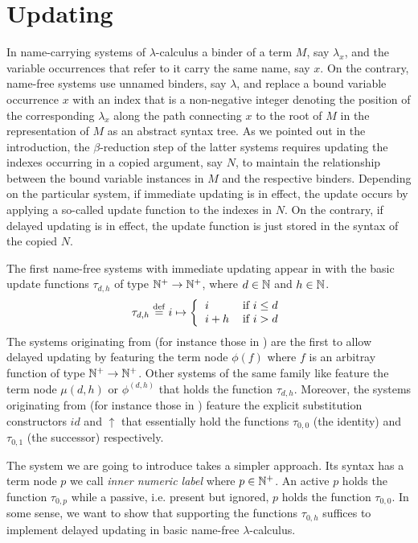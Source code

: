 \section{Updating}
\label{sec:updating}

In name-carrying systems of $\lambda$-calculus
a binder of a term $M$, say $\lambda_x$, and the variable occurrences
that refer to it carry the same name, say $x$.
On the contrary, name-free systems use unnamed binders, say $\lambda$,
and replace a bound variable occurrence $x$
with an index that is a non-negative integer denoting the position of
the corresponding $\lambda_x$ along the path connecting $x$ to the
root of $M$ in the representation of $M$ as an abstract syntax tree.
As we pointed out in the introduction,
the $\beta$-reduction step of the latter systems  
requires updating the indexes occurring in a copied
argument, say $N$, to maintain the relationship between the bound variable
instances in $M$ and the respective binders.
Depending on the particular system,
if immediate updating is in effect, the update occurs by 
applying a so-called update function to the indexes in $N$. On the
contrary, if delayed updating is in effect, the update function
is just stored in the syntax of the copied $N$.

The first name-free systems with immediate updating appear in \cite{Bru72}
with the basic update functions $\tau_{d,h}$ of type $\mathbb{N}^+ \to \mathbb{N}^+$,
where $d\in\mathbb{N}$ and $h\in\mathbb{N}$.
\[
\tau_{d,h} \defeq i \mapsto
\left\{\begin{tabular}{ll}
$i$&if $i \le d$\\
$i+h$&if $i > d$\\
\end{tabular}\right.
\]
The systems originating from \cite{Bru78a}
(for instance those in \cite{Bru78b})
are the first to allow delayed updating
by featuring the term node $\phi(f)$
where $f$ is an arbitray function of type $\mathbb{N}^+ \to \mathbb{N}^+$.
Other systems of the same family like \cite{Ned79,Ned80,KN93}
feature the term node $\mu(d,h)$ or $\phi^{(d,h)}$
that holds the function $\tau_{d,h}$.
Moreover, the systems originating from \cite{ACCL91}
(for instance those in \cite{CHL96})
feature the explicit substitution constructors $\mathit{id}$ and $\uparrow$
that essentially hold the functions $\tau_{0,0}$ (the identity)
and $\tau_{0,1}$ (the successor) respectively.

The system we are going to introduce takes a simpler approach.
Its syntax has a term node $p$ we call \emph{inner numeric label}
where $p \in \mathbb{N}^+$.
An active $p$ holds the function $\tau_{0,p}$
while a passive, i.e. present but ignored, $p$ holds the function $\tau_{0,0}$.
In some sense, we want to show that supporting the functions $\tau_{0,h}$
suffices to implement delayed updating in basic name-free $\lambda$-calculus.
